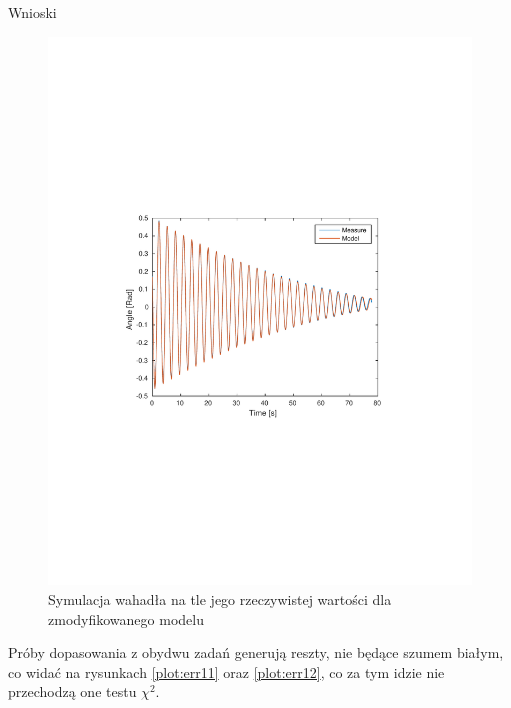 \documentclass[12pt]{article}
\begin{document}
\begin{section}{Wnioski}
    \begin{figure}[!htb]
      \begin{center}
        \includegraphics[width=14cm,trim=3cm 8.5cm 3cm 9cm,clip]
        {../res/img/est11a.pdf}
      \end{center}
      \caption{Symulacja wahadła na tle jego rzeczywistej wartości dla
      zmodyfikowanego modelu}
      \label{plot:est11a}
    \end{figure}
    
    Próby dopasowania z obydwu zadań generują reszty, nie będące szumem białym,
    co widać na rysunkach \ref{plot:err11} oraz \ref{plot:err12}, co za tym
    idzie nie przechodzą one testu $\chi^2$.
  
  \end{section}
\end{document}
